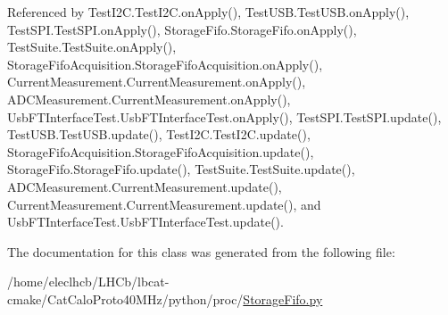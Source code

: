 Referenced by Test\+I2\+C.\+Test\+I2\+C.\+on\+Apply(), Test\+U\+S\+B.\+Test\+U\+S\+B.\+on\+Apply(), Test\+S\+P\+I.\+Test\+S\+P\+I.\+on\+Apply(), Storage\+Fifo.\+Storage\+Fifo.\+on\+Apply(), Test\+Suite.\+Test\+Suite.\+on\+Apply(), Storage\+Fifo\+Acquisition.\+Storage\+Fifo\+Acquisition.\+on\+Apply(), Current\+Measurement.\+Current\+Measurement.\+on\+Apply(), A\+D\+C\+Measurement.\+Current\+Measurement.\+on\+Apply(), Usb\+F\+T\+Interface\+Test.\+Usb\+F\+T\+Interface\+Test.\+on\+Apply(), Test\+S\+P\+I.\+Test\+S\+P\+I.\+update(), Test\+U\+S\+B.\+Test\+U\+S\+B.\+update(), Test\+I2\+C.\+Test\+I2\+C.\+update(), Storage\+Fifo\+Acquisition.\+Storage\+Fifo\+Acquisition.\+update(), Storage\+Fifo.\+Storage\+Fifo.\+update(), Test\+Suite.\+Test\+Suite.\+update(), A\+D\+C\+Measurement.\+Current\+Measurement.\+update(), Current\+Measurement.\+Current\+Measurement.\+update(), and Usb\+F\+T\+Interface\+Test.\+Usb\+F\+T\+Interface\+Test.\+update().



The documentation for this class was generated from the following file\+:\begin{DoxyCompactItemize}
\item 
/home/eleclhcb/\+L\+H\+Cb/lbcat-\/cmake/\+Cat\+Calo\+Proto40\+M\+Hz/python/proc/\hyperlink{StorageFifo_8py}{Storage\+Fifo.\+py}\end{DoxyCompactItemize}
